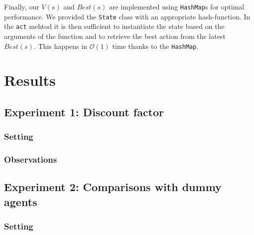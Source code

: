 \documentclass[11pt]{article}
\begin{document}
Finally, our $V(s)$ and $Best(s)$ are implemented using \texttt{HashMap}s for 
optimal performance. We provided the \texttt{State} class with an appropriate 
hash-function. In the \texttt{act} mehtod it is then sufficient to instantiate 
the state based on the arguments of the function and to retrieve the best action 
from the latest $Best(s)$. This happens in $\mathcal{O}(1)$ time thanks to the 
\texttt{HashMap}.


\section{Results}

\subsection{Experiment 1: Discount factor}

\subsubsection{Setting}

\subsubsection{Observations}

\subsection{Experiment 2: Comparisons with dummy agents}

\subsubsection{Setting}
\end{document}

